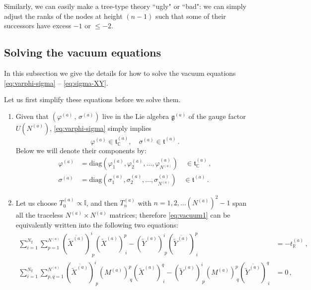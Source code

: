 \documentclass[12pt,a4paper]{article}
\renewcommand{\(}{\left(}
\renewcommand{\)}{\right)}
\renewcommand{\(}{\left(}
\renewcommand{\)}{\right)}
\begin{document}
Similarly, we can easily make a tree-type theory ``ugly" or ``bad": we can simply adjust the ranks of the nodes at height $(n-1)$ such that some of their successors have excess $-1$ or $\leq-2$. 

\subsection{Solving the vacuum equations}
\label{appssec:VacuumEq}

In this subsection we give the details for how to solve the vacuum equations \eqref{eq:varphi-sigma} -- \eqref{eq:sigma-XY}.

Let us first simplify these equations before we solve them. 
\begin{enumerate}
\item Given that $(\varphi^{(a)}\, , \, \sigma^{(a)})$ live in the Lie algebra $\mathfrak{g}^{(a)}$ of the gauge factor $U(N^{(a)})$, \eqref{eq:varphi-sigma} simply implies
\begin{equation}
\varphi^{(a)}\in \mathfrak{t}^{(a)}_{\mathbb{C}},\quad\sigma^{(a)}\in \mathfrak{t}^{(a)}\,.
\end{equation}
Below we will denote their components by:
\begin{equation}
    \begin{aligned}
        \varphi^{(a)}&=\text{diag}(\varphi^{(a)}_1,\varphi^{(a)}_2,\dots,\varphi^{(a)}_{N^{(a)}}) \quad\in \mathfrak{t}^{(a)}_{\mathbb{C}}\,,\\
        \sigma^{(a)}&=\text{diag}(\sigma^{(a)}_1,\sigma^{(a)}_2,\dots,\sigma^{(a)}_{N^{(a)}}) \quad\in \mathfrak{t}^{(a)}\,.
    \end{aligned}
\end{equation}
\item Let us choose $T^{(a)}_0\propto \mathbb{I}$, and then $T^{(a)}_n$ with $n=1,2,\dots (N^{(a)})^2-1$ span all the traceless $N^{(a)}\times N^{(a)}$ matrices; therefore \eqref{eq:vacuum1} can be equivalently written into the following two equations:
\begin{align}
\sum_{i=1}^{N_\mathtt{f}}\sum^{N^{(a)}}_{p=1}(\overline{\tilde{X}^{(a)}})^i_{\ p} (\tilde{X}^{(a)})^p_{\ i}-(\tilde{Y}^{(a)})^i_{\ p} (\overline{\tilde{Y}^{(a)}})^p_{\ i}&=-t^{(a)}_{\mathbb{R}}\,,\label{eq:vacuum_XY1}\\
\sum_{i=1}^{N_\mathtt{f}}\sum^{N^{(a)}}_{p,q=1}(\overline{\tilde{X}^{(a)}})^i_{\ p} (M^{(a)})^p_{\ q} (\tilde{X}^{(a)})^q_{\ i}-(\tilde{Y}^{(a)})^i_{\ p} (M^{(a)})^p_{\ q}(\overline{\tilde{Y}^{(a)}})^q_{\ i}&=0\,, 

\end{align}
\end{enumerate}
\end{document}
